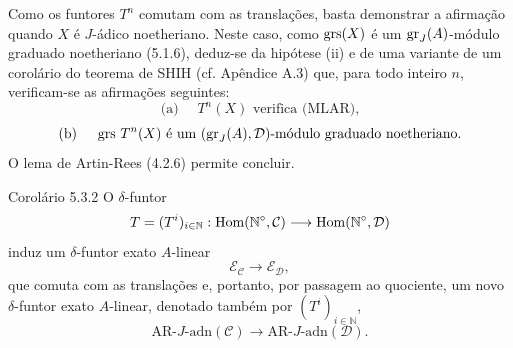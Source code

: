 \begin{prooftext}[Demonstração]
Como os funtores \(T^n\) comutam com as translações, basta demonstrar a afirmação quando \(X\) é \(J\)-ádico noetheriano. Neste caso, como \(\operatorname{grs}(X)\) é um \(\operatorname{gr}_J(A)\)-módulo graduado noetheriano (5.1.6), deduz-se da hipótese (ii) e de uma variante de um corolário do teorema de SHIH (cf. Apêndice A.3) que, para todo inteiro \(n\), verificam-se as afirmações seguintes:
\[
\text{(a) }\quad T^n(X)\text{ verifica (MLAR),}
\]
\[
\text{(b) }\quad \operatorname{grs}\,T^n(X)\text{ é um }(\operatorname{gr}_J(A),\mathcal D)\text{-módulo graduado noetheriano.}
\]
O lema de Artin-Rees (4.2.6) permite concluir.
\end{prooftext}

\begin{statement}{Corolário 5.3.2}
O \(\delta\)-funtor
\[
T=(T^i)_{i\in\mathbb N}:\operatorname{Hom}(\mathbb N^\circ,\mathcal C)\longrightarrow\operatorname{Hom}(\mathbb N^\circ,\mathcal D)
\]
induz um \(\delta\)-funtor exato \(A\)-linear
\[
\mathcal E_{\mathcal C}\longrightarrow\mathcal E_{\mathcal D},
\]
que comuta com as translações e, portanto, por passagem ao quociente, um novo \(\delta\)-funtor exato \(A\)-linear, denotado também por \((T^i)_{i\in\mathbb N}\),
\[
\mathrm{AR}\text{-}J\text{-adn}(\mathcal C)\longrightarrow
\mathrm{AR}\text{-}J\text{-adn}(\mathcal D).
\]
\end{statement}
